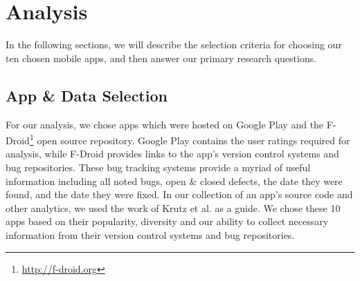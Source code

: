 \documentclass{sig-alternate}
\begin{document}







\section{Analysis}
\label{sec:analysis}

In the following sections, we will describe the selection criteria for choosing our ten chosen mobile apps, and then answer our primary research questions.

\subsection{App \& Data Selection}


For our analysis, we chose apps which were hosted on Google Play and the F-Droid\footnote{\url{http://f-droid.org}} open source repository. Google Play contains the user ratings required for analysis, while F-Droid provides links to the app's version control systems and bug repositories. These bug tracking systems provide a myriad of useful information including all noted bugs, open \& closed defects, the date they were found, and the date they were fixed. In our collection of an app's source code and other analytics, we used the work of Krutz et al.\cite{krutz2015FDroid} as a guide. We chose these 10 apps based on their popularity, diversity and our ability to collect necessary information from their version control systems and bug repositories.


\end{document}
